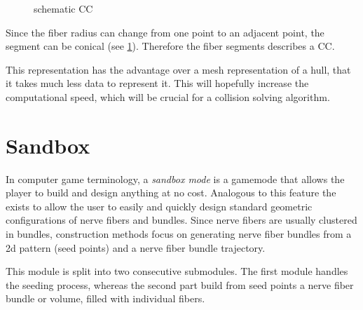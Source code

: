 %
\begin{figure}[!t]
    \centering
    \setlength{\tikzwidth}{0.5\textwidth}
	\caption{schematic  \ac{CC}}
	\label{fig:conical}
\end{figure}
%
Since the fiber radius can change from one point to an adjacent point, the segment can be conical (see \cref{fig:conical}).
Therefore the fiber segments describes a \ac{CC}.
\par
%
This representation has the advantage over a mesh representation of a hull, that it takes much less data to represent it.
This will hopefully increase the computational speed, which will be crucial for a collision solving algorithm.
%
\section{Sandbox}\label{sec:sandbox}
%
In computer game terminology, a \textit{sandbox mode} is a gamemode that allows the player to build and design anything at no cost.
Analogous to this feature the  exists to allow the user to easily and quickly design standard geometric configurations of nerve fibers and bundles.
Since nerve fibers are usually clustered in bundles, construction methods focus on generating nerve fiber bundles from a 2d pattern (seed points) and a nerve fiber bundle trajectory.
\par
%
This module is split into two consecutive submodules.
The first module handles the seeding process, whereas the second part build from seed points a nerve fiber bundle or volume, filled with individual fibers.
%
